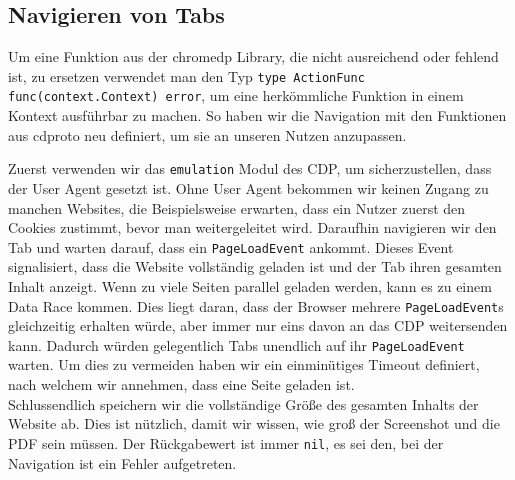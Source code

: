 \subsection{Navigieren von Tabs} \label{scraper:subsec:go:navigate}
Um eine Funktion aus der chromedp Library, die nicht ausreichend oder fehlend ist, zu ersetzen verwendet man den Typ \texttt{type ActionFunc func(context.Context) error}, um eine herkömmliche Funktion in einem Kontext ausführbar zu machen. So haben wir die Navigation mit den Funktionen aus cdproto neu definiert, um sie an unseren Nutzen anzupassen.

Zuerst verwenden wir das \verb|emulation| Modul des CDP, um sicherzustellen, dass der User Agent gesetzt ist. Ohne User Agent bekommen wir keinen Zugang zu manchen Websites, die Beispielsweise erwarten, dass ein Nutzer zuerst den Cookies zustimmt, bevor man weitergeleitet wird. Daraufhin navigieren wir den Tab und warten darauf, dass ein \verb|PageLoadEvent| ankommt. Dieses Event signalisiert, dass die Website vollständig geladen ist und der Tab ihren gesamten Inhalt anzeigt. Wenn zu viele Seiten parallel geladen werden, kann es zu einem Data Race kommen. Dies liegt daran, dass der Browser mehrere \verb|PageLoadEvent|s gleichzeitig erhalten würde, aber immer nur eins davon an das CDP weitersenden kann. Dadurch würden gelegentlich Tabs unendlich auf ihr \verb|PageLoadEvent| warten. Um dies zu vermeiden haben wir ein einminütiges Timeout definiert, nach welchem wir annehmen, dass eine Seite geladen ist. \\ Schlussendlich speichern wir die vollständige Größe des gesamten Inhalts der Website ab. Dies ist nützlich, damit wir wissen, wie groß der Screenshot und die PDF sein müssen. Der Rückgabewert ist immer \verb|nil|, es sei den, bei der Navigation ist ein Fehler aufgetreten.

